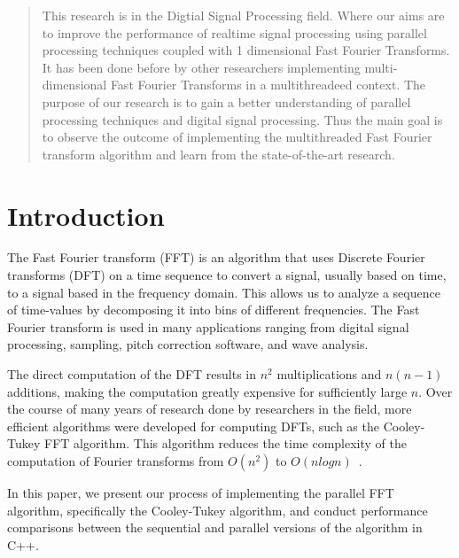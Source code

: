 \documentclass[journal]{IEEEtran}
\begin{document}
\maketitle

\begin{abstract}
This research is in the Digtial Signal Processing field. Where our aims are to improve the performance of realtime signal processing using parallel processing techniques coupled with 1 dimensional Fast Fourier Transforms.  It has been done before by other researchers implementing multi-dimensional Fast Fourier Transforms in a multithreadeed context. The purpose of our research is to gain a better understanding of parallel processing techniques and digital signal processing. Thus the main goal is to observe the outcome of implementing the multithreaded Fast Fourier transform algorithm and learn from the state-of-the-art research.
\end{abstract}

\section{Introduction}
	\par {The Fast Fourier transform (FFT) is an algorithm that uses Discrete Fourier transforms
	 (DFT) on a time sequence to convert a signal, usually based on time, to a signal based in the
	 frequency domain. This allows us to analyze a sequence of time-values by decomposing it into
	 bins of different frequencies. The Fast Fourier transform is used in many applications ranging
	 from digital signal processing, sampling, pitch correction software, and wave analysis.}

	\par {The direct computation of the DFT results in $n^2$ multiplications and $n(n-1)$ additions,
	making the computation greatly expensive for sufficiently large $n$.  Over the course of many years
	of research done by researchers in the field, more efficient algorithms were developed for computing DFTs,
	such as the Cooley-Tukey FFT algorithm. This algorithm reduces the time complexity of the computation of
	Fourier transforms from $O(n^2)$ to $O(nlogn)$~\cite{Xiang}}.

	\par {In this paper, we present our process of implementing the parallel FFT algorithm, specifically
	the Cooley-Tukey algorithm, and conduct performance comparisons between the sequential and
	parallel versions of the algorithm in C++.}
\end{document}

